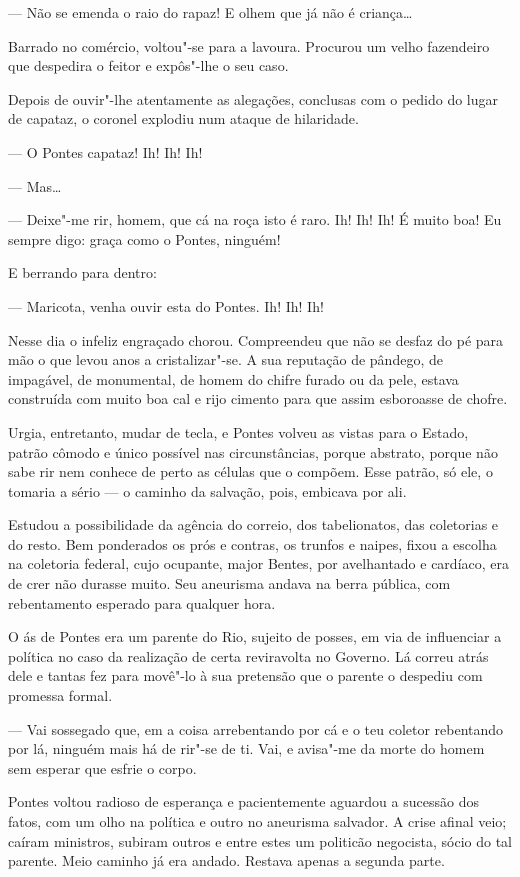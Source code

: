 --- Não se emenda o raio do rapaz! E olhem que já não é criança\ldots{}

Barrado no comércio, voltou"-se para a lavoura. Procurou um velho
fazendeiro que despedira o feitor e expôs"-lhe o seu caso.

Depois de ouvir"-lhe atentamente as alegações, conclusas com o pedido do
lugar de capataz, o coronel explodiu num ataque de hilaridade.

--- O Pontes capataz! Ih! Ih! Ih!

--- Mas\ldots{}

--- Deixe"-me rir, homem, que cá na roça isto é raro. Ih! Ih! Ih! É muito
boa! Eu sempre digo: graça como o Pontes, ninguém!

E berrando para dentro:

--- Maricota, venha ouvir esta do Pontes. Ih! Ih! Ih!

Nesse dia o infeliz engraçado chorou. Compreendeu que não se desfaz do
pé para mão o que levou anos a cristalizar"-se. A sua reputação de
pândego, de impagável, de monumental, de homem do chifre furado ou da
pele, estava construída com muito boa cal e rijo cimento para que assim
esboroasse de chofre.

Urgia, entretanto, mudar de tecla, e Pontes volveu as vistas para o
Estado, patrão cômodo e único possível nas circunstâncias, porque
abstrato, porque não sabe rir nem conhece de perto as células que o
compõem. Esse patrão, só ele, o tomaria a sério --- o caminho da
salvação, pois, embicava por ali.

Estudou a possibilidade da agência do correio, dos tabelionatos, das
coletorias e do resto. Bem ponderados os prós e contras, os trunfos e
naipes, fixou a escolha na coletoria federal, cujo ocupante, major
Bentes, por avelhantado e cardíaco, era de crer não durasse muito. Seu
aneurisma andava na berra pública, com rebentamento esperado para
qualquer hora.

O ás de Pontes era um parente do Rio, sujeito de posses, em via de
influenciar a política no caso da realização de certa reviravolta no
Governo. Lá correu atrás dele e tantas fez para movê"-lo à sua pretensão
que o parente o despediu com promessa formal.

--- Vai sossegado que, em a coisa arrebentando por cá e o teu coletor
rebentando por lá, ninguém mais há de rir"-se de ti. Vai, e avisa"-me da
morte do homem sem esperar que esfrie o corpo.

Pontes voltou radioso de esperança e pacientemente aguardou a sucessão
dos fatos, com um olho na política e outro no aneurisma salvador. A
crise afinal veio; caíram ministros, subiram outros e entre estes um
politicão negocista, sócio do tal parente. Meio caminho já era andado.
Restava apenas a segunda parte.

